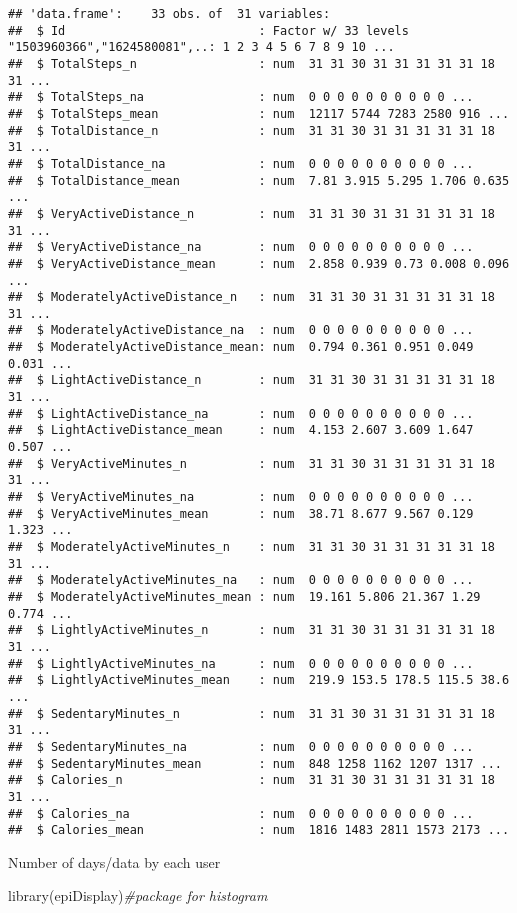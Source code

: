 \documentclass[
]{article}
\newenvironment{Shaded}{\begin{snugshade}}{\end{snugshade}}
\newcommand{\CommentTok}[1]{\textcolor[rgb]{0.56,0.35,0.01}{\textit{#1}}}
\newcommand{\FunctionTok}[1]{\textcolor[rgb]{0.00,0.00,0.00}{#1}}
\newcommand{\NormalTok}[1]{#1}
\begin{document}
\begin{verbatim}
## 'data.frame':    33 obs. of  31 variables:
##  $ Id                           : Factor w/ 33 levels "1503960366","1624580081",..: 1 2 3 4 5 6 7 8 9 10 ...
##  $ TotalSteps_n                 : num  31 31 30 31 31 31 31 31 18 31 ...
##  $ TotalSteps_na                : num  0 0 0 0 0 0 0 0 0 0 ...
##  $ TotalSteps_mean              : num  12117 5744 7283 2580 916 ...
##  $ TotalDistance_n              : num  31 31 30 31 31 31 31 31 18 31 ...
##  $ TotalDistance_na             : num  0 0 0 0 0 0 0 0 0 0 ...
##  $ TotalDistance_mean           : num  7.81 3.915 5.295 1.706 0.635 ...
##  $ VeryActiveDistance_n         : num  31 31 30 31 31 31 31 31 18 31 ...
##  $ VeryActiveDistance_na        : num  0 0 0 0 0 0 0 0 0 0 ...
##  $ VeryActiveDistance_mean      : num  2.858 0.939 0.73 0.008 0.096 ...
##  $ ModeratelyActiveDistance_n   : num  31 31 30 31 31 31 31 31 18 31 ...
##  $ ModeratelyActiveDistance_na  : num  0 0 0 0 0 0 0 0 0 0 ...
##  $ ModeratelyActiveDistance_mean: num  0.794 0.361 0.951 0.049 0.031 ...
##  $ LightActiveDistance_n        : num  31 31 30 31 31 31 31 31 18 31 ...
##  $ LightActiveDistance_na       : num  0 0 0 0 0 0 0 0 0 0 ...
##  $ LightActiveDistance_mean     : num  4.153 2.607 3.609 1.647 0.507 ...
##  $ VeryActiveMinutes_n          : num  31 31 30 31 31 31 31 31 18 31 ...
##  $ VeryActiveMinutes_na         : num  0 0 0 0 0 0 0 0 0 0 ...
##  $ VeryActiveMinutes_mean       : num  38.71 8.677 9.567 0.129 1.323 ...
##  $ ModeratelyActiveMinutes_n    : num  31 31 30 31 31 31 31 31 18 31 ...
##  $ ModeratelyActiveMinutes_na   : num  0 0 0 0 0 0 0 0 0 0 ...
##  $ ModeratelyActiveMinutes_mean : num  19.161 5.806 21.367 1.29 0.774 ...
##  $ LightlyActiveMinutes_n       : num  31 31 30 31 31 31 31 31 18 31 ...
##  $ LightlyActiveMinutes_na      : num  0 0 0 0 0 0 0 0 0 0 ...
##  $ LightlyActiveMinutes_mean    : num  219.9 153.5 178.5 115.5 38.6 ...
##  $ SedentaryMinutes_n           : num  31 31 30 31 31 31 31 31 18 31 ...
##  $ SedentaryMinutes_na          : num  0 0 0 0 0 0 0 0 0 0 ...
##  $ SedentaryMinutes_mean        : num  848 1258 1162 1207 1317 ...
##  $ Calories_n                   : num  31 31 30 31 31 31 31 31 18 31 ...
##  $ Calories_na                  : num  0 0 0 0 0 0 0 0 0 0 ...
##  $ Calories_mean                : num  1816 1483 2811 1573 2173 ...
\end{verbatim}

Number of days/data by each user

\begin{Shaded}
\begin{Highlighting}[]
\FunctionTok{library}\NormalTok{(epiDisplay)}\CommentTok{\#package for histogram}
\end{Highlighting}
\end{Shaded}
\end{document}
